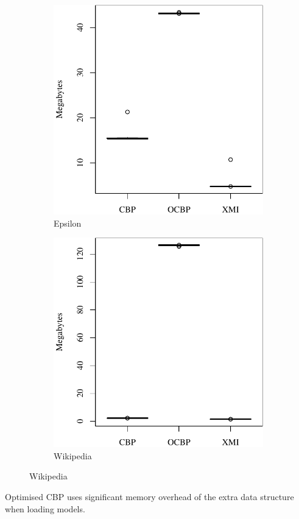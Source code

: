 \documentclass{beamer}
\begin{document}
\begin{frame}[fragile]
\begin{figure}[ht]
\begin{subfigure}{0.325\textwidth}
        \includegraphics[width=\linewidth]{load_memory_epsilon}
        \caption{Epsilon}
        \label{fig:load_memory_epsilon}
    \end{subfigure}
    \hfill
    \begin{subfigure}{0.325\textwidth}
        \centering
        \includegraphics[width=\linewidth]{load_memory_wikipedia}
        \caption{Wikipedia}
        \label{fig:load_memory_wikipedia}
    \end{subfigure}
    \label{fig:loadmemory}
\end{figure}
Optimised CBP uses significant memory overhead of the extra data structure when loading models.
\end{frame}
\end{document}
